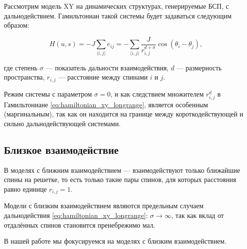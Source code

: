  Рассмотрим модель XY на динамических структурах, генерируемые БСП, с дальнодействием. Гамильтониан такой системы будет задаваться следующим образом: 
 
   \begin{equation}
   	  	\label{eq:hamiltonian_xy_longrange}
 H(u,s)  = -J \sum_{ \langle i, j \rangle } e_{ij} =-\sum_{\langle i, j \rangle } \frac{J}{r^{d+\sigma}_{i,j}} \cos (\theta_i - \theta_j), 
   \end{equation} 
   
    где степень  $\sigma$ --- показатель дальности взаимодействия,   $d$ --- размерность пространства, $r_{i,j}$ --- расстояние между спинами $i$ и $j$.
    
    Режим системы с  параметром $\sigma=0$, и как следствием множителем   $r^d_{i,j}$ в   Гамильтониане \eqref{eq:hamiltonian_xy_longrange},   является  особенным (маргинальным), так как он находится на границе между короткодействующей и  сильно  дальнодействующей системами. 
   
 \subsection{  Близкое взаимодействие }\label{sub1:sec:2_ch:1}
 
 В моделях с ближним взаимодействием --- взаимодействуют только ближайшие спины на решетке, то есть только такие пары спинов, для которых расстояния равно единице  $r_{i,j}=1$. 
 
 Модели с близким взаимодействием являются предельным случаем дальнодействия  \eqref{eq:hamiltonian_xy_longrange}: $\sigma \rightarrow \infty $,  так как вклад от отдалённых спинов становится пренебрежимо мал.
 
  В нашей работе мы фокусируемся на моделях с близким взаимодействием. 
 
 
 
 
 

